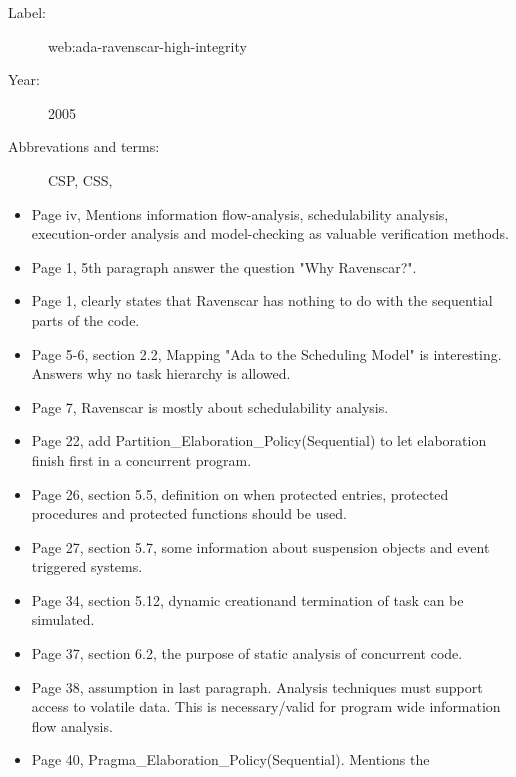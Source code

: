 \begin{description}
    \item[Label:] web:ada-ravenscar-high-integrity \cite{web:ada-ravenscar-high-integrity}
    \item[Year:] 2005
    \item[Abbrevations and terms:]
        CSP,
        CSS,
\end{description}


\begin{itemize}
    \item Page iv, Mentions information flow-analysis, schedulability analysis,
        execution-order analysis and model-checking as valuable verification
        methods.
    \item Page 1, 5th paragraph answer the question "Why Ravenscar?".
    \item Page 1, clearly states that Ravenscar has nothing to do with the
        sequential parts of the code.
    \item Page 5-6, section 2.2, Mapping "Ada to the Scheduling Model" is
        interesting. Answers why no task hierarchy is allowed.
    \item Page 7, Ravenscar is mostly about schedulability analysis.
    \item Page 22, add Partition\_Elaboration\_Policy(Sequential) to let
        elaboration finish first in a concurrent program.
    \item Page 26, section 5.5, definition on when protected entries, protected
        procedures and protected functions should be used.
    \item Page 27, section 5.7, some information about suspension objects and
        event triggered systems.
    \item Page 34, section 5.12, dynamic creationand termination of task can be
        simulated.
    \item Page 37, section 6.2, the purpose of static analysis of concurrent
        code.
    \item Page 38, assumption in last paragraph. Analysis techniques must
        support access to volatile data. This is necessary/valid for program
        wide information flow analysis.
    \item Page 40, Pragma\_Elaboration\_Policy(Sequential). Mentions the

\end{itemize}
